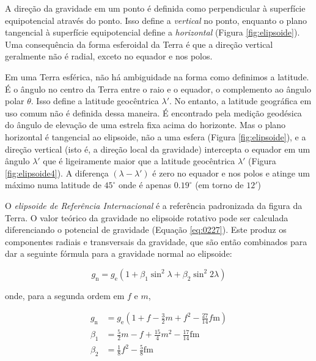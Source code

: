\documentclass[]{book}
\theoremstyle{definition}
\theoremstyle{definition}
\theoremstyle{definition}
\theoremstyle{remark}
\begin{document}
A direção da gravidade em um ponto é definida como perpendicular à superfície equipotencial através do ponto. Isso define a \emph{vertical} no ponto, enquanto o plano tangencial à superfície equipotencial define a \emph{horizontal} (Figura \ref{fig:elipsoide}). Uma consequência da forma esferoidal da Terra é que a direção vertical geralmente não é radial, exceto no equador e nos polos.

Em uma Terra esférica, não há ambiguidade na forma como definimos a latitude. É o ângulo no centro da Terra entre o raio e o equador, o complemento ao ângulo polar \(\theta\). Isso define a latitude geocêntrica \(\lambda'\). No entanto, a latitude geográfica em uso comum não é definida dessa maneira. É encontrado pela medição geodésica do ângulo de elevação de uma estrela fixa acima do horizonte. Mas o plano horizontal é tangencial ao elipsoide, não a uma esfera (Figura \ref{fig:elipsoide}), e a direção vertical (isto é, a direção local da gravidade) intercepta o equador em um ângulo \(\lambda'\) que é ligeiramente maior que a latitude geocêntrica \(\lambda'\) (Figura \ref{fig:elipsoide4}). A diferença \((\lambda-\lambda')\) é zero no equador e nos polos e atinge um máximo numa latitude de \(45^\circ\) onde é apenas \(0.19^\circ\) (em torno de \(12'\))

O \emph{elipsoide de Referência Internacional} é a referência padronizada da figura da Terra. O valor teórico da gravidade no elipsoide rotativo pode ser calculada diferenciando o potencial de gravidade (Equação \eqref{eq:0227}). Este produz os componentes radiais e transversais da gravidade, que são então combinados para dar a seguinte fórmula para a gravidade normal ao elipsoide:

\begin{equation}
g_{\mathrm{n}}=g_{\mathrm{e}}\left(1+\beta_{1} \sin ^{2} \lambda+\beta_{2} \sin ^{2} 2 \lambda\right) \label{eq:0230}
\end{equation}

onde, para a segunda ordem em \(f\) e \(m\),

\begin{align}
g_{\mathrm{n}}&=g_{\mathrm{e}}\left(1+f-\frac{3}{2} m+f^{2}-\frac{27}{14} f \mathrm{m}\right) \nonumber \\
\beta_{1} &=\frac{5}{2} m-f+\frac{15}{4} m^{2}-\frac{17}{14} \mathrm{fm} \label{eq:0231}\\
\beta_{2} &=\frac{1}{8} f^{2}-\frac{5}{8} \mathrm{fm} \nonumber
\end{align}
\end{document}
